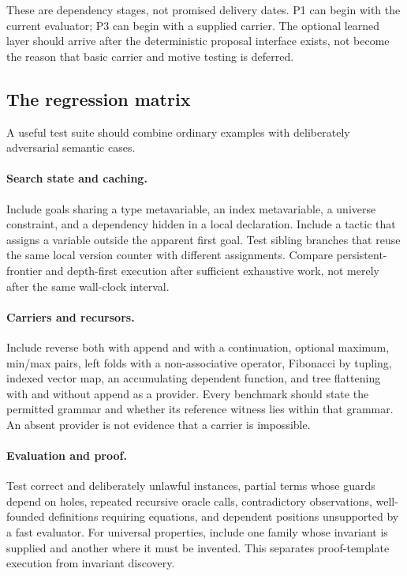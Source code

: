 \documentclass[11pt,a4paper]{article}
\theoremstyle{definition}
\theoremstyle{remark}
\newcommand{\code}[1]{\texttt{\detokenize{#1}}}
\begin{document}
These are dependency stages, not promised delivery dates. P1 can begin with
the current evaluator; P3 can begin with a supplied carrier. The optional
learned layer should arrive after the deterministic proposal interface exists,
not become the reason that basic carrier and motive testing is deferred.

\subsection{The regression matrix}
A useful test suite should combine ordinary examples with deliberately
adversarial semantic cases.

\paragraph{Search state and caching.}
Include goals sharing a type metavariable, an index metavariable, a universe
constraint, and a dependency hidden in a local declaration. Include a tactic
that assigns a variable outside the apparent first goal. Test sibling branches
that reuse the same local version counter with different assignments. Compare
persistent-frontier and depth-first execution after sufficient exhaustive
work, not merely after the same wall-clock interval.

\paragraph{Carriers and recursors.}
Include reverse both with append and with a continuation, optional maximum,
min/max pairs, left folds with a non-associative operator, Fibonacci by tupling,
indexed vector map, an accumulating dependent function, and tree flattening
with and without append as a provider. Every benchmark should state the
permitted grammar and whether its reference witness lies within that grammar.
An absent provider is not evidence that a carrier is impossible.

\paragraph{Evaluation and proof.}
Test correct and deliberately unlawful \code{BEq} instances, partial terms
whose guards depend on holes, repeated recursive oracle calls, contradictory
observations, well-founded definitions requiring equations, and dependent
positions unsupported by a fast evaluator. For universal properties, include
one family whose invariant is supplied and another where it must be invented.
This separates proof-template execution from invariant discovery.
\end{document}
